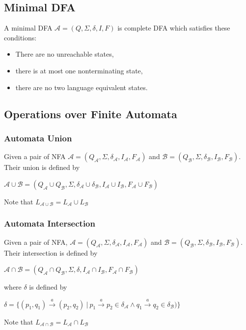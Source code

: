 	\subsection{Minimal DFA}
	\label{defMinDFA}
		A minimal DFA $\mathcal{A}=(Q,\Sigma,\delta,I,F)$ is complete DFA which satisfies these conditions:
		\begin{itemize}
			\item There are no unreachable states,
			\item there is at most one nonterminating state,
			\item there are no two language equivalent states.
		\end{itemize}

  \subsection{Operations over Finite Automata}
    \subsubsection{Automata Union}
    \label{defAUnion}
      Given a pair of NFA $\mathcal{A}=(Q_\mathcal{A},\Sigma,\delta_\mathcal{A},I_\mathcal{A},F_\mathcal{A})$ 
      and $\mathcal{B}=(Q_\mathcal{B},\Sigma,\delta_\mathcal{B},I_\mathcal{B},F_\mathcal{B})$. Their union is defined by
      \begin{description}
        \item $\mathcal{A} \cup \mathcal{B}=(Q_\mathcal{A}\cup Q_\mathcal{B},\Sigma,
            \delta_\mathcal{A}\cup\delta_\mathcal{B},I_\mathcal{A}\cup I_\mathcal{B},F_\mathcal{A}\cup F_\mathcal{B})$
      \end{description}
      Note that $L_{\mathcal{A}\cup\mathcal{B}}=L_\mathcal{A}\cup L_\mathcal{B}$
    
    \subsubsection{Automata Intersection}
    \label{defAInter}
      Given a pair of NFA, $\mathcal{A}=(Q_\mathcal{A},\Sigma,\delta_\mathcal{A},I_\mathcal{A},F_\mathcal{A})$ 
      and $\mathcal{B}=(Q_\mathcal{B},\Sigma,\delta_\mathcal{B},I_\mathcal{B},F_\mathcal{B})$. Their intersection is defined by
      \begin{description}
        \item $\mathcal{A} \cap \mathcal{B}=(Q_\mathcal{A}\cap Q_\mathcal{B},\Sigma,\delta,I_\mathcal{A}\cap I_\mathcal{B},F_\mathcal{A}\cap F_\mathcal{B})$\
      \end{description}
      where $\delta$ is defined by
      \begin{description}
        \item $\delta = 
        \{(p_1,q_1) \xrightarrow{a} (p_2,q_2)\ |\ p_1 \xrightarrow{a} p_2 \in \delta_\mathcal{A} \wedge q_1 \xrightarrow{a} q_2 \in \delta_\mathcal{B})\}$\
      \end{description}
      Note that $L_{\mathcal{A}\cap\mathcal{B}}=L_\mathcal{A}\cap L_\mathcal{B}$

